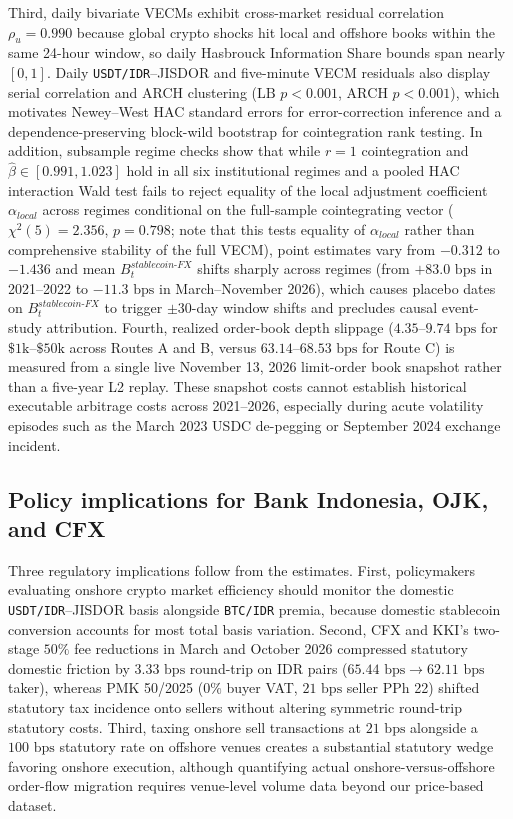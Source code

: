 Third, daily bivariate VECMs exhibit cross-market residual correlation $\rho_u = 0.990$ because global crypto shocks hit local and offshore books within the same 24-hour window, so daily Hasbrouck Information Share bounds span nearly $[0,1]$. Daily \texttt{USDT/IDR}--JISDOR and five-minute VECM residuals also display serial correlation and ARCH clustering ($\text{LB } p < 0.001$, $\text{ARCH } p < 0.001$), which motivates Newey--West HAC standard errors for error-correction inference and a dependence-preserving block-wild bootstrap for cointegration rank testing. In addition, subsample regime checks show that while $r=1$ cointegration and $\hat{\beta} \in [0.991, 1.023]$ hold in all six institutional regimes and a pooled HAC interaction Wald test fails to reject equality of the local adjustment coefficient $\alpha_{local}$ across regimes conditional on the full-sample cointegrating vector ($\chi^2(5) = 2.356$, $p = 0.798$; note that this tests equality of $\alpha_{local}$ rather than comprehensive stability of the full VECM), point estimates vary from $-0.312$ to $-1.436$ and mean $B_t^{stablecoin\text{-}FX}$ shifts sharply across regimes (from $+83.0\text{ bps}$ in 2021--2022 to $-11.3\text{ bps}$ in March--November 2026), which causes placebo dates on $B_t^{stablecoin\text{-}FX}$ to trigger $\pm 30$-day window shifts and precludes causal event-study attribution. Fourth, realized order-book depth slippage ($4.35$--$9.74\text{ bps}$ for $\$1\text{k}$--$\$50\text{k}$ across Routes A and B, versus $63.14$--$68.53\text{ bps}$ for Route C) is measured from a single live November 13, 2026 limit-order book snapshot rather than a five-year L2 replay. These snapshot costs cannot establish historical executable arbitrage costs across 2021--2026, especially during acute volatility episodes such as the March 2023 USDC de-pegging or September 2024 exchange incident.

\subsection{Policy implications for Bank Indonesia, OJK, and CFX}
Three regulatory implications follow from the estimates. First, policymakers evaluating onshore crypto market efficiency should monitor the domestic \texttt{USDT/IDR}--JISDOR basis alongside \texttt{BTC/IDR} premia, because domestic stablecoin conversion accounts for most total basis variation. Second, CFX and KKI's two-stage $50\%$ fee reductions in March and October 2026 compressed statutory domestic friction by $3.33\text{ bps}$ round-trip on IDR pairs ($65.44\text{ bps} \rightarrow 62.11\text{ bps}$ taker), whereas PMK 50/2025 ($0\%$ buyer VAT, $21\text{ bps}$ seller PPh 22) shifted statutory tax incidence onto sellers without altering symmetric round-trip statutory costs. Third, taxing onshore sell transactions at $21\text{ bps}$ alongside a $100\text{ bps}$ statutory rate on offshore venues creates a substantial statutory wedge favoring onshore execution, although quantifying actual onshore-versus-offshore order-flow migration requires venue-level volume data beyond our price-based dataset.
